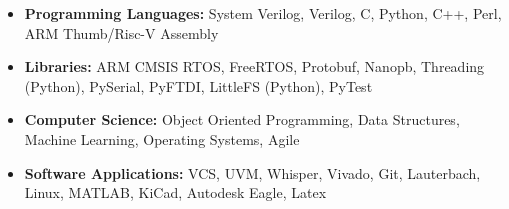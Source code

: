 \documentclass[../main.tex]{subfiles}
\begin{document}
\vspace{-\topsep}
\begin{itemize}
  \setlength{\itemindent}{-6mm}
  \vspace{-0.2cm}\item {\fontsize{10.5}{15}\selectfont \textbf{Programming Languages:} System Verilog, Verilog, C, Python, C++, Perl, ARM Thumb/Risc-V Assembly}
  \vspace{-0.4cm}\item {\fontsize{10.5}{11}\selectfont \textbf{Libraries:} ARM CMSIS RTOS, FreeRTOS, Protobuf, Nanopb, Threading (Python), PySerial, PyFTDI, LittleFS (Python), PyTest}
  \vspace{-0.4cm}\item {\fontsize{10.5}{11}\selectfont \textbf{Computer Science:} Object Oriented Programming, Data Structures, Machine Learning, Operating Systems, Agile}
  \vspace{-0.4cm}\item {\fontsize{10.5}{11}\selectfont \textbf{Software Applications:} VCS, UVM, Whisper, Vivado, Git, Lauterbach, Linux, MATLAB, KiCad, 
  Autodesk Eagle, Latex}
\end{itemize}
\end{document}
